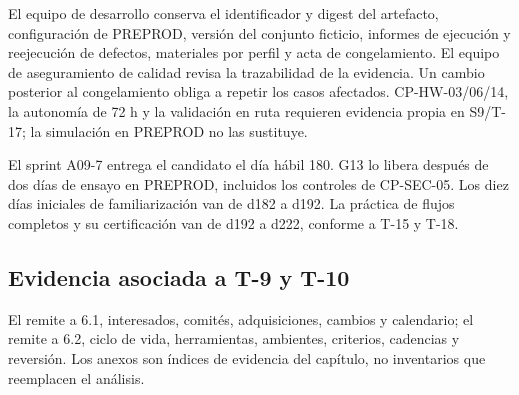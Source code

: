 El equipo de desarrollo conserva el identificador y digest del artefacto, configuración de PREPROD, versión del conjunto ficticio, informes de ejecución y reejecución de defectos, materiales por perfil y acta de congelamiento. El equipo de aseguramiento de calidad revisa la trazabilidad de la evidencia. Un cambio posterior al congelamiento obliga a repetir los casos afectados. CP-HW-03/06/14, la autonomía de 72 h y la validación en ruta requieren evidencia propia en S9/T-17; la simulación en PREPROD no las sustituye.

El sprint A09-7 entrega el candidato el día hábil 180. G13 lo libera después de dos días de ensayo en PREPROD, incluidos los controles de CP-SEC-05. Los diez días iniciales de familiarización van de d182 a d192. La práctica de flujos completos y su certificación van de d192 a d222, conforme a T-15 y T-18.

\FloatBarrier
\subsection{Evidencia asociada a T-9 y T-10}\label{sec:06-evidencia-asociada-a-t-9-y-t-10}

El  remite a 6.1, interesados, comités, adquisiciones, cambios y calendario; el  remite a 6.2, ciclo de vida, herramientas, ambientes, criterios, cadencias y reversión. Los anexos son índices de evidencia del capítulo, no inventarios que reemplacen el análisis.
